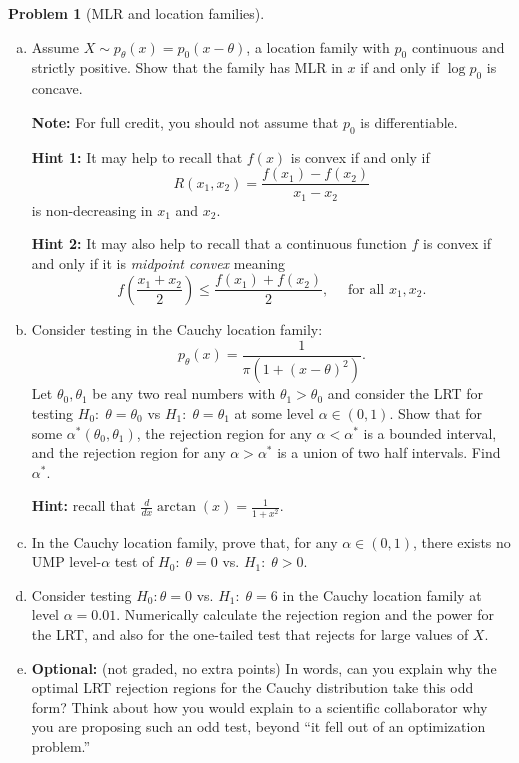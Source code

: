 \documentclass{article}
\theoremstyle{definition}
\newtheorem{problem}{Problem}
\begin{document}
\begin{problem}[MLR and location families]
\begin{enumerate}[(a)]
\item Assume $X\sim p_\theta(x) = p_0(x-\theta)$, a location family with $p_0$ continuous and strictly positive. Show that the family has MLR in $x$ if and only if $\log p_0$ is concave. 

{\bf Note:} For full credit, you should not assume that $p_0$ is differentiable.

{\bf Hint 1:} It may help to recall that $f(x)$ is convex if and only if
\[
R(x_1,x_2) = \frac{f(x_1) - f(x_2)}{x_1-x_2}
\]
is non-decreasing in $x_1$ and $x_2$. 

{\bf Hint 2:} It may also help to recall that a continuous function $f$ is convex if and only if it is {\em midpoint convex} meaning
\[
f\left(\frac{x_1+x_2}{2}\right) \leq \frac{f(x_1) + f(x_2)}{2}, \quad \text{ for all } x_1,x_2.
\]




\item Consider testing in the Cauchy location family:
\[
p_{\theta}(x) = \frac{1}{\pi (1+(x-\theta)^2)}.
\]
Let $\theta_0, \theta_1$ be any two real numbers with $\theta_1> \theta_0$ and consider the LRT for testing $H_0:\; \theta = \theta_0$ vs $H_1:\; \theta = \theta_1$ at some level $\alpha \in (0,1)$. Show that for some $\alpha^*(\theta_0,\theta_1)$, the rejection region for any $\alpha < \alpha^*$ is a bounded interval, and the rejection region for any $\alpha > \alpha^*$ is a union of two half intervals. Find $\alpha^*$.

{\bf Hint:} recall that $\frac{d}{dx}\arctan(x) = \frac{1}{1+x^2}$.




\item In the Cauchy location family, prove that, for any $\alpha \in (0,1)$, there exists no UMP level-$\alpha$ test of $H_0:\;\theta = 0$ vs. $H_1:\; \theta > 0$.



\item Consider testing $H_0:\theta = 0$ vs. $H_1:\; \theta = 6$ in the Cauchy location family at level $\alpha = 0.01$. Numerically calculate the rejection region and the power for the LRT, and also for the one-tailed test that rejects for large values of $X$.



\item {\bf Optional:} (not graded, no extra points) In words, can you explain why the optimal LRT rejection regions for the Cauchy distribution take this odd form? Think about how you would explain to a scientific collaborator why you are proposing such an odd test, beyond ``it fell out of an optimization problem.''




\end{enumerate}
\end{problem}
\end{document}
